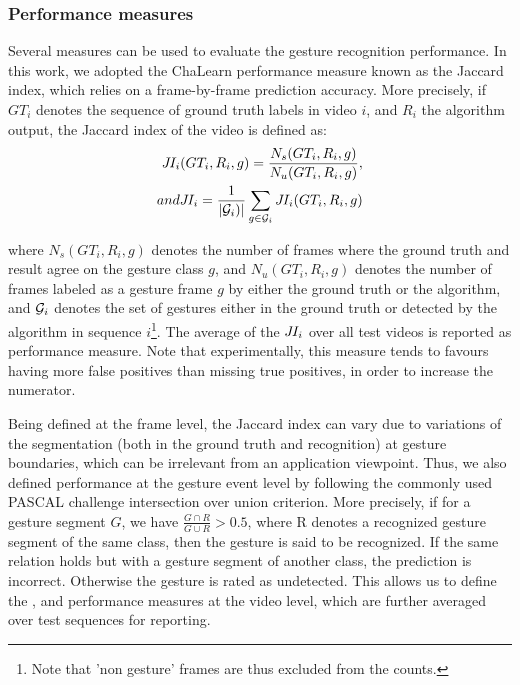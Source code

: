 \subsubsection{Performance measures}

Several measures can be used to evaluate the gesture recognition performance.
%
In this work, we adopted the ChaLearn performance measure known as the Jaccard index, which relies on a frame-by-frame prediction accuracy.
More precisely, if $GT_i$ denotes the sequence of ground truth labels in video $i$, and $R_i$ the algorithm output, the Jaccard index
of the video is defined as:
\begin{align}
\jaccardindex_i(GT_i, R_i,g) = \frac{N_s(GT_i, R_i,g)}{N_u(GT_i, R_i,g)},
\\
\mbox{and } \jaccardindex_i = \frac{1}{|{\cal G}_i)|} \sum_{g \in {\cal G}_i} \jaccardindex_i(GT_i, R_i,g)
\end{align}

where $N_s(GT_i, R_i, g)$ denotes the number of frames where the ground truth and result agree on the gesture class $g$,
and $N_u(GT_i, R_i, g)$ denotes the number of frames labeled as a gesture frame $g$ by  either the ground truth or the algorithm,
and ${{\cal G}_i}$ denotes the set of gestures either in the ground truth or detected by the algorithm in sequence $i$\footnote{Note that 'non gesture' frames are thus excluded from the counts.}. The average of the $J\hspace*{-0.1em}I_i$ over all test videos is reported as performance measure.
%
Note that experimentally, this measure tends to favours having more false positives than missing true positives, in order to increase the numerator.

Being defined at the frame level, the Jaccard index can vary due to variations of the segmentation (both in the ground truth and recognition)
at gesture boundaries, which can be irrelevant from an application viewpoint.
%
Thus, we also defined performance at the gesture event level by following the commonly used PASCAL challenge intersection over union criterion.
More precisely, if for a gesture segment $G$, we have $\frac{G \cap R}{G \cup R} >  0.5$, where R denotes a recognized gesture
segment of the same class, then the  gesture is said to be recognized.
%
If the same relation holds but with a gesture segment of another class, the prediction is incorrect.
Otherwise the gesture is rated as undetected. This allows us to define the \eventaccuracy, \eventconfused and \eventmissed performance measures at the video level,
which are further averaged over test sequences for reporting.


